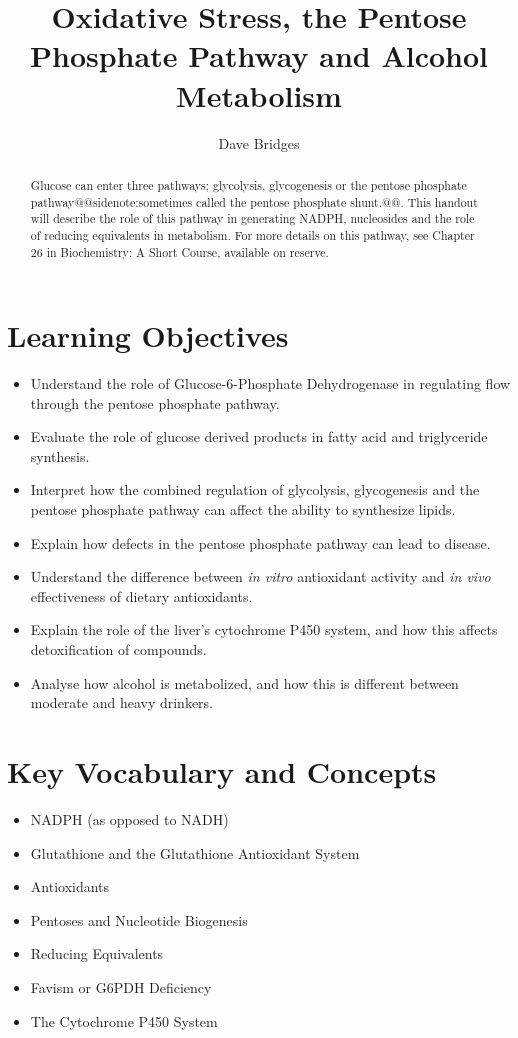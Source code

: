 \documentclass{tufte-handout}
\title{Oxidative Stress, the Pentose Phosphate Pathway and Alcohol Metabolism}
\author{Dave Bridges}
\makeatletter
\def\sidenote#1{@@sidenote:#1@@}
\makeatother
\begin{document}
\maketitle%

\begin{abstract}
\noindent Glucose can enter three pathways; glycolysis, glycogenesis or the pentose phosphate pathway\sidenote{sometimes called the pentose phosphate shunt.}.  This handout will describe the role of this pathway in generating NADPH, nucleosides and the role of reducing equivalents in metabolism.   For more details on this pathway, see Chapter 26 in Biochemistry: A Short Course, available on reserve\cite{Berg2015}.
\end{abstract}

\tableofcontents
\pagebreak
\section{Learning Objectives}

\begin{itemize}
\item Understand the role of Glucose-6-Phosphate Dehydrogenase in regulating flow through the pentose phosphate pathway.
\item Evaluate the role of glucose derived products in fatty acid and triglyceride synthesis.
\item Interpret how the combined regulation of glycolysis, glycogenesis and the pentose phosphate pathway can affect the ability to synthesize lipids.
\item Explain how defects in the pentose phosphate pathway can lead to disease.
\item Understand the difference between \textit{in vitro} antioxidant activity and \textit{in vivo} effectiveness of dietary antioxidants.
\item Explain the role of the liver's cytochrome P450 system, and how this affects detoxification of compounds.
\item Analyse how alcohol is metabolized, and how this is different between moderate and heavy drinkers.
\end{itemize}

\section{Key Vocabulary and Concepts}
\begin{itemize}
	\item NADPH (as opposed to NADH)
	\item Glutathione and the Glutathione Antioxidant System
	\item Antioxidants
	\item Pentoses and Nucleotide Biogenesis
	\item Reducing Equivalents
	\item Favism or G6PDH Deficiency
	\item The Cytochrome P450 System
\end{itemize}
\end{document}
